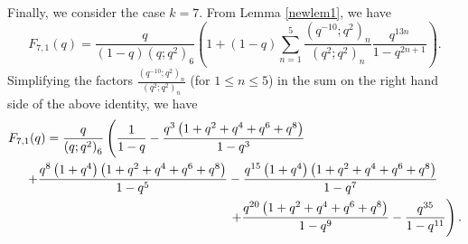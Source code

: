 \documentclass[12pt,reqno]{amsart}
\renewcommand{\(}{\left\(}
\renewcommand{\)}{\right\)}
\numberwithin{equation}{section}
\theoremstyle{plain}
\theoremstyle{definition}
\numberwithin{equation}{section}
\begin{document}
Finally, we consider the case $k=7$. From Lemma \ref{newlem1}, we have
\begin{equation*}
F_{7,1}(q) = \frac{q}{\left(1-q\right)\left(q;q^2\right)_6} \left(1+(1-q) \sum_{n=1}^{5} \frac{\left(q^{-10};q^2\right)_n}{\left(q^2;q^2\right)_n} \frac{q^{13n}}{1-q^{2n+1}}\right).
\end{equation*}
Simplifying the factors $\frac{(q^{-10};q^2)_n}{(q^2;q^2)_n}$ (for $1\le n\le 5$) in the sum on the right hand side of the above identity, we have 
\begin{align*}
F_{7,1} (q) &= \frac{q}{\left(q;q^2\right)_6} \left(\frac{1}{1-q}-\frac{q^3\left(1+q^2+q^4+q^6+q^8\right)}{1-q^3}\right.\\ &\hspace{-1 cm}\quad \, \left. + \frac{q^8 \left(1+q^4\right)\left(1+q^2+q^4+q^6+q^8\right)}{1-q^5}-\frac{q^{15}\left(1+q^4\right)\left(1+ q^2+q^4+q^6+q^8\right)}{1-q^7} \right.\\
&\hspace{4.7 cm}\quad \, \left. + \frac{q^{20} \left(1+q^2+q^4+q^6+q^8\right)}{1-q^9} - \frac{q^{35}}{1-q^{11}}\right). 
\end{align*}
\end{document}
